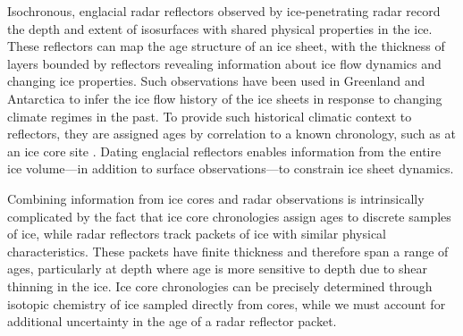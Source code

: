 

Isochronous, englacial radar reflectors observed by ice-penetrating radar record the depth and extent of isosurfaces with shared physical properties in the ice. These reflectors can map the age structure of an ice sheet, with the thickness of layers bounded by reflectors revealing information about ice flow dynamics and changing ice properties. Such observations have been used in Greenland and Antarctica to infer the ice flow history of the ice sheets in response to changing climate regimes in the past. To provide such historical climatic context to reflectors, they are assigned ages by correlation to a known chronology, such as at an ice core site \citep{cavitte2016}. Dating englacial reflectors enables information from the entire ice volume---in addition to surface observations---to constrain ice sheet dynamics. 

Combining information from ice cores and radar observations is intrinsically complicated by the fact that ice core chronologies assign ages to discrete samples of ice, while radar reflectors track packets of ice with similar physical characteristics. These packets have finite thickness and therefore span a range of ages, particularly at depth where age is more sensitive to depth due to shear thinning in the ice. Ice core chronologies can be precisely determined through isotopic chemistry of ice sampled directly from cores, while we must account for additional uncertainty in the age of a radar reflector packet.

